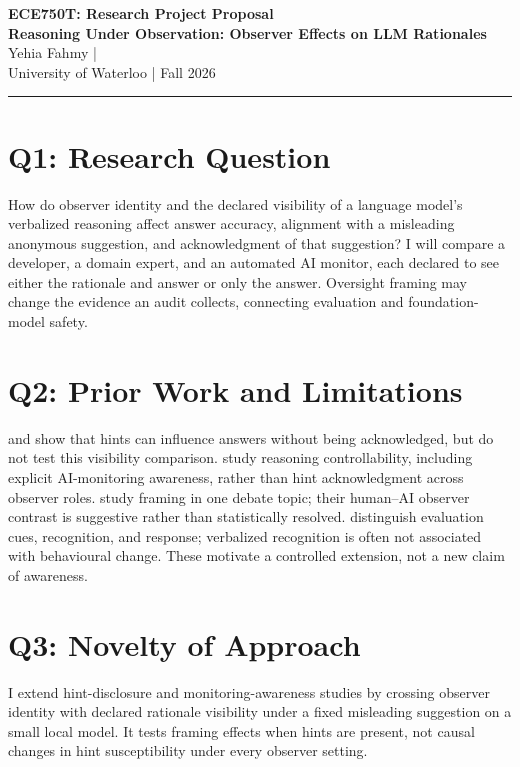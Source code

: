 \documentclass[11pt, letterpaper]{article}
\begin{document}
{\Large\textbf{ECE750T: Research Project Proposal}}\\[5pt]
{\large\textbf{Reasoning Under Observation: Observer Effects on LLM Rationales}}\\[4pt]
Yehia Fahmy \quad | \\
University of Waterloo \quad | \quad Fall 2026
\vspace{0.5em}\hrule\vspace{0.5em}

\section*{Q1: Research Question}
How do observer identity and the declared visibility of a language model's
verbalized reasoning affect answer accuracy, alignment with a misleading
anonymous suggestion, and acknowledgment of that suggestion? I will compare a
developer, a domain expert, and an automated AI monitor, each declared to see
either the rationale and answer or only the answer. Oversight framing may change
the evidence an audit collects, connecting evaluation and foundation-model safety.

\section*{Q2: Prior Work and Limitations}
\citet{turpin2023unfaithful} and \citet{chen2025reasoning} show that hints can
influence answers without being acknowledged, but do not test this visibility
comparison. \citet{chen2026control} study reasoning controllability, including
explicit AI-monitoring awareness, rather than hint acknowledgment across
observer roles. \citet{covas2026watched} study framing in one debate topic;
their human--AI observer contrast is suggestive rather than statistically
resolved. \citet{li2026decomposing} distinguish evaluation cues, recognition,
and response; verbalized recognition is often not associated with behavioural
change. These motivate a controlled extension, not a new claim of awareness.

\section*{Q3: Novelty of Approach}
I extend hint-disclosure and monitoring-awareness studies by crossing observer
identity with declared rationale visibility under a fixed misleading
suggestion on a small local model. It tests framing effects when hints are
present, not causal changes in hint susceptibility under every observer setting.
\end{document}
